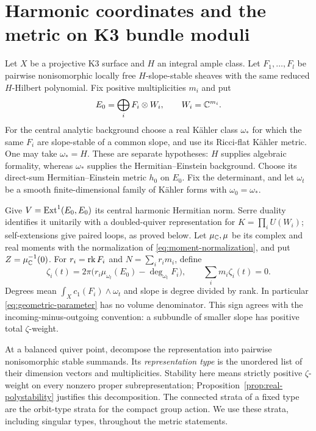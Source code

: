 \section{Harmonic coordinates and the metric on K3 bundle moduli}
\label{sec:harmonic}

Let $X$ be a projective K3 surface and $H$ an integral ample class.
Let $F_1,\ldots,F_l$ be pairwise nonisomorphic locally free
$H$-slope-stable sheaves with the same reduced $H$-Hilbert polynomial.
Fix positive multiplicities $m_i$ and put
\[
 E_0=\bigoplus_i F_i\otimes W_i,\qquad W_i=\mathbb C^{m_i}.
\]
For the central analytic background choose a real K\"ahler class
$\omega_*$ for which the same $F_i$ are slope-stable of a common slope,
and use its Ricci-flat K\"ahler metric. One may take $\omega_*=H$.
These are separate hypotheses: $H$ supplies algebraic formality,
whereas $\omega_*$ supplies the Hermitian--Einstein background.
Choose its direct-sum Hermitian--Einstein metric $h_0$ on $E_0$.
Fix the determinant, and let $\omega_t$ be a smooth finite-dimensional
family of K\"ahler forms with $\omega_0=\omega_*$.

Give $V=\operatorname{Ext}^1(E_0,E_0)$ its central harmonic Hermitian norm.
Serre duality identifies it unitarily with a doubled-quiver
representation for $K=\prod_iU(W_i)$; self-extensions give paired
loops, as proved below. Let $\mu_{\mathbb C},\mu$ be its complex and real
moments with the normalization of \eqref{eq:moment-normalization},
and put $Z=\mu_{\mathbb C}^{-1}(0)$.
For $r_i=\operatorname{rk} F_i$ and $N=\sum_i r_im_i$, define
\begin{equation}\label{eq:geometric-parameter}
 \zeta_i(t)=2\pi\bigl(r_i\mu_{\omega_t}(E_0)
                  -\deg_{\omega_t}F_i\bigr),
 \qquad \sum_i m_i\zeta_i(t)=0.
\end{equation}
Degrees mean $\int_Xc_1(F_i)\wedge\omega_t$ and slope is degree
divided by rank. In particular \eqref{eq:geometric-parameter}
has no volume denominator.
This sign agrees with the incoming-minus-outgoing convention:
a subbundle of smaller slope has positive total $\zeta$-weight.

At a balanced quiver point, decompose the representation into
pairwise nonisomorphic stable summands. Its \emph{representation type}
is the unordered list of their dimension vectors and multiplicities.
Stability here means strictly positive $\zeta$-weight on every
nonzero proper subrepresentation; Proposition~\ref{prop:real-polystability}
justifies this decomposition. The connected strata of a fixed type
are the orbit-type strata for the compact group action. We use
these strata, including singular types, throughout the metric statements.

